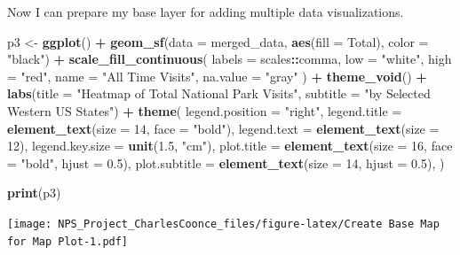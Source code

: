 \documentclass[
]{article}
\newenvironment{Shaded}{\begin{snugshade}}{\end{snugshade}}
\newcommand{\AttributeTok}[1]{\textcolor[rgb]{0.13,0.29,0.53}{#1}}
\newcommand{\DecValTok}[1]{\textcolor[rgb]{0.00,0.00,0.81}{#1}}
\newcommand{\FloatTok}[1]{\textcolor[rgb]{0.00,0.00,0.81}{#1}}
\newcommand{\FunctionTok}[1]{\textcolor[rgb]{0.13,0.29,0.53}{\textbf{#1}}}
\newcommand{\NormalTok}[1]{#1}
\newcommand{\OtherTok}[1]{\textcolor[rgb]{0.56,0.35,0.01}{#1}}
\newcommand{\SpecialCharTok}[1]{\textcolor[rgb]{0.81,0.36,0.00}{\textbf{#1}}}
\newcommand{\StringTok}[1]{\textcolor[rgb]{0.31,0.60,0.02}{#1}}
\begin{document}
Now I can prepare my base layer for adding multiple data visualizations.

\begin{Shaded}
\begin{Highlighting}[]
\NormalTok{p3 }\OtherTok{\textless{}{-}} \FunctionTok{ggplot}\NormalTok{() }\SpecialCharTok{+}
  \FunctionTok{geom\_sf}\NormalTok{(}\AttributeTok{data =}\NormalTok{ merged\_data, }\FunctionTok{aes}\NormalTok{(}\AttributeTok{fill =}\NormalTok{ Total), }\AttributeTok{color =} \StringTok{"black"}\NormalTok{) }\SpecialCharTok{+}
  \FunctionTok{scale\_fill\_continuous}\NormalTok{(}
    \AttributeTok{labels =}\NormalTok{ scales}\SpecialCharTok{::}\NormalTok{comma, }
    \AttributeTok{low =} \StringTok{"white"}\NormalTok{, }
    \AttributeTok{high =} \StringTok{"red"}\NormalTok{, }
    \AttributeTok{name =} \StringTok{"All Time Visits"}\NormalTok{, }
    \AttributeTok{na.value =} \StringTok{"gray"}
\NormalTok{  ) }\SpecialCharTok{+}
  \FunctionTok{theme\_void}\NormalTok{() }\SpecialCharTok{+}
  \FunctionTok{labs}\NormalTok{(}\AttributeTok{title =} \StringTok{"Heatmap of Total National Park Visits"}\NormalTok{,}
       \AttributeTok{subtitle =} \StringTok{"by Selected Western US States"}\NormalTok{) }\SpecialCharTok{+}
  \FunctionTok{theme}\NormalTok{(}
    \AttributeTok{legend.position =} \StringTok{"right"}\NormalTok{,}
    \AttributeTok{legend.title =} \FunctionTok{element\_text}\NormalTok{(}\AttributeTok{size =} \DecValTok{14}\NormalTok{, }\AttributeTok{face =} \StringTok{"bold"}\NormalTok{), }
    \AttributeTok{legend.text =} \FunctionTok{element\_text}\NormalTok{(}\AttributeTok{size =} \DecValTok{12}\NormalTok{), }
    \AttributeTok{legend.key.size =} \FunctionTok{unit}\NormalTok{(}\FloatTok{1.5}\NormalTok{, }\StringTok{"cm"}\NormalTok{),  }
    \AttributeTok{plot.title =} \FunctionTok{element\_text}\NormalTok{(}\AttributeTok{size =} \DecValTok{16}\NormalTok{, }\AttributeTok{face =} \StringTok{"bold"}\NormalTok{, }\AttributeTok{hjust =} \FloatTok{0.5}\NormalTok{),}
    \AttributeTok{plot.subtitle =} \FunctionTok{element\_text}\NormalTok{(}\AttributeTok{size =} \DecValTok{14}\NormalTok{, }\AttributeTok{hjust =} \FloatTok{0.5}\NormalTok{),}
\NormalTok{  )}

\FunctionTok{print}\NormalTok{(p3)}
\end{Highlighting}
\end{Shaded}

\texttt{[image: NPS\_Project\_CharlesCoonce\_files/figure-latex/Create Base Map for Map Plot-1.pdf]}

\newpage
\end{document}
